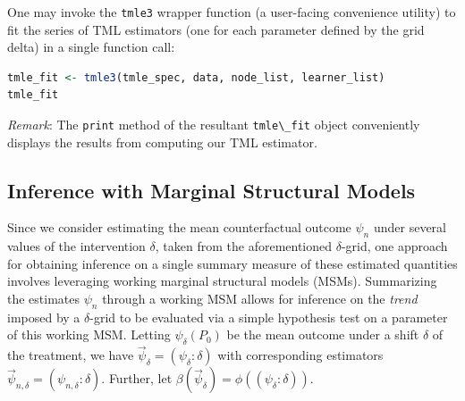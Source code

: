 \documentclass[
  12pt, krantz2,
]{krantz}
\newcommand{\passthrough}[1]{#1}
\theoremstyle{definition}
\theoremstyle{definition}
\theoremstyle{definition}
\newcommand{\1}{\mathbbm{1}}
\begin{document}
One may invoke the \passthrough{\lstinline!tmle3!} wrapper function (a user-facing convenience utility)
to fit the series of TML estimators (one for each parameter defined by the grid
delta) in a single function call:

\begin{lstlisting}[language=R]
tmle_fit <- tmle3(tmle_spec, data, node_list, learner_list)
tmle_fit
\end{lstlisting}

\emph{Remark}: The \passthrough{\lstinline!print!} method of the resultant \passthrough{\lstinline!tmle\_fit!} object conveniently
displays the results from computing our TML estimator.

\hypertarget{inference-with-marginal-structural-models}{%
\subsection{Inference with Marginal Structural Models}\label{inference-with-marginal-structural-models}}

Since we consider estimating the mean counterfactual outcome \(\psi_n\) under
several values of the intervention \(\delta\), taken from the aforementioned
\(\delta\)-grid, one approach for obtaining inference on a single summary measure
of these estimated quantities involves leveraging working marginal structural
models (MSMs). Summarizing the estimates \(\psi_n\) through a working MSM allows
for inference on the \emph{trend} imposed by a \(\delta\)-grid to be evaluated via a
simple hypothesis test on a parameter of this working MSM. Letting
\(\psi_{\delta}(P_0)\) be the mean outcome under a shift \(\delta\) of the
treatment, we have \(\vec{\psi}_{\delta} = (\psi_{\delta}: \delta)\) with
corresponding estimators \(\vec{\psi}_{n, \delta} = (\psi_{n, \delta}: \delta)\).
Further, let \(\beta(\vec{\psi}_{\delta}) = \phi((\psi_{\delta}: \delta))\).
\end{document}
